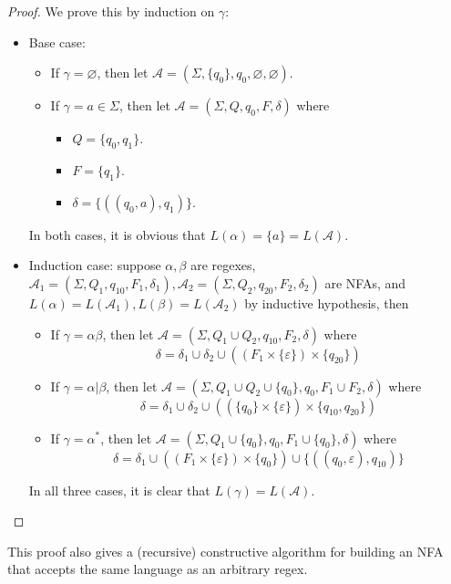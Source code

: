 \documentclass[titlepage]{article}
\theoremstyle{plain}
\theoremstyle{definition}
\theoremstyle{remark}
\begin{document}
\begin{proof}
  We prove this by induction on $\gamma$:
  \begin{itemize}
    \item Base case:
      \begin{itemize}
        \item If $\gamma=\varnothing$, then let $\mathcal{A}=(\Sigma,\{q_0\},
          q_0,\varnothing,\varnothing)$.
        \item If $\gamma=a\in\Sigma$, then let $\mathcal{A}=(\Sigma,Q,q_0,F,
          \delta)$ where
          \begin{itemize}
            \item $Q=\{q_0,q_1\}$.
            \item $F=\{q_1\}$.
            \item $\delta=\{((q_0,a),q_1)\}$.
          \end{itemize}
      \end{itemize}
      In both cases, it is obvious that $L(\alpha)=\{a\}=L(\mathcal{A})$.
    \item Induction case: suppose $\alpha,\beta$ are regexes, $\mathcal{A}_1
      =(\Sigma,Q_1,q_{10},F_1,\delta_1), \mathcal{A}_2=(\Sigma,Q_2,q_{20},F_2,
      \delta_2)$ are NFAs, and $L(\alpha)=L(\mathcal{A}_1),L(\beta)=
      L(\mathcal{A}_2)$ by inductive hypothesis, then
      \begin{itemize}
        \item If $\gamma=\alpha\beta$, then let $\mathcal{A}=(\Sigma,
          Q_1\cup Q_2,q_{10},F_2,\delta)$ where
          \[
            \delta=\delta_1\cup\delta_2\cup((F_1\times\{\varepsilon\})
            \times\{q_{20}\})
          \]
        \item If $\gamma=\alpha|\beta$, then let $\mathcal{A}=(\Sigma,
          Q_1\cup Q_2\cup\{q_0\},q_{0},F_1\cup F_2,\delta)$ where
          \[
            \delta=\delta_1\cup\delta_2\cup((\{q_0\}\times\{\varepsilon\})
            \times\{q_{10},q_{20}\})
          \]
        \item If $\gamma=\alpha^*$, then let $\mathcal{A}=(\Sigma,
          Q_1\cup\{q_0\},q_0,F_1\cup\{q_0\},\delta)$ where
          \[
            \delta=\delta_1\cup((F_1\times\{\varepsilon\})\times\{q_{0}\})
            \cup\{((q_0,\varepsilon),q_{10})\}
          \]
      \end{itemize}
      In all three cases, it is clear that $L(\gamma)=L(\mathcal{A})$.
  \end{itemize}
\end{proof}
This proof also gives a (recursive) constructive algorithm for building an
NFA that accepts the same language as an arbitrary regex.
\end{document}
